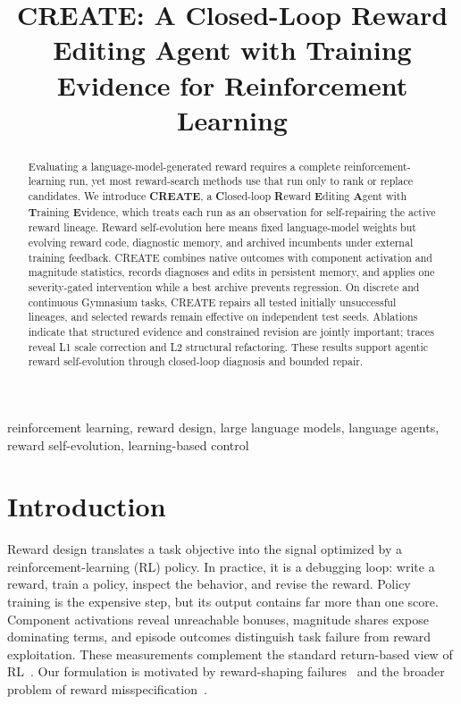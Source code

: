 \documentclass[conference]{IEEEtran}
\title{CREATE: A Closed-Loop Reward Editing Agent with Training Evidence for
Reinforcement Learning}
\author{\IEEEauthorblockN{Anonymous Authors}
\IEEEauthorblockA{Anonymous Submission}}
\begin{document}
\maketitle

\begin{abstract}
Evaluating a language-model-generated reward requires a complete
reinforcement-learning run, yet most reward-search methods use that run only
to rank or replace candidates. We introduce
\textbf{CREATE}, a \textbf{C}losed-loop \textbf{R}eward \textbf{E}diting
\textbf{A}gent with \textbf{T}raining \textbf{E}vidence, which treats each run
as an observation for self-repairing the active reward lineage. Reward
self-evolution here means fixed language-model weights but evolving reward
code, diagnostic memory, and archived incumbents under external training
feedback. CREATE combines native outcomes with component activation and
magnitude statistics, records diagnoses and edits in persistent memory, and
applies one severity-gated intervention while a best archive prevents
regression. On discrete and continuous Gymnasium tasks, CREATE repairs all
tested initially unsuccessful lineages, and selected rewards remain effective
on independent test seeds. Ablations indicate that structured evidence and
constrained revision are jointly important; traces reveal L1 scale correction
and L2 structural refactoring. These results support agentic reward
self-evolution through closed-loop diagnosis and bounded repair.
\end{abstract}

\begin{IEEEkeywords}
reinforcement learning, reward design, large language models, language agents,
reward self-evolution, learning-based control
\end{IEEEkeywords}

\section{Introduction}
Reward design translates a task objective into the signal optimized by a
reinforcement-learning (RL) policy. In practice, it is a debugging loop: write
a reward, train a policy, inspect the behavior, and revise the reward. Policy
training is the expensive step, but its output contains far more than one
score. Component activations reveal unreachable bonuses, magnitude shares
expose dominating terms, and episode outcomes distinguish task failure from
reward exploitation. These measurements complement the standard return-based
view of RL~\cite{sutton2018rl}. Our formulation is motivated by
reward-shaping failures~\cite{ng1999policy} and the broader problem of reward
misspecification~\cite{hadfield2017inverse}.
\end{document}

